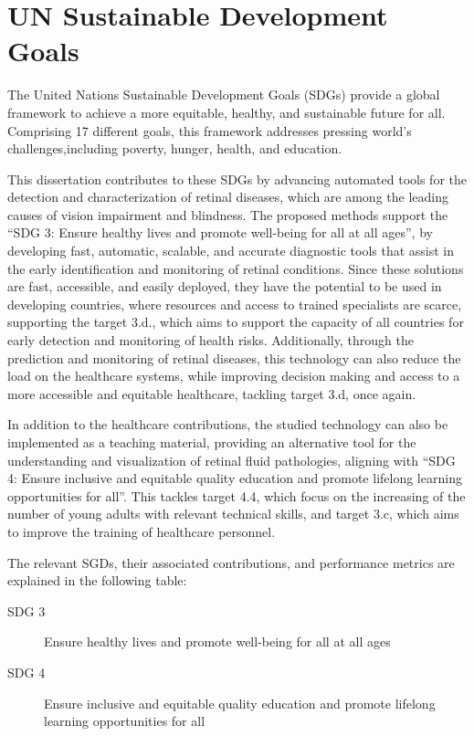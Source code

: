\chapter*{UN Sustainable Development Goals} \label{chap:UnitedNations}

The United Nations Sustainable Development Goals (SDGs) provide a global framework to achieve a more equitable, healthy, and sustainable future for all. Comprising 17 different goals, this framework addresses pressing world's challenges,including poverty, hunger, health, and education.
\par
This dissertation contributes to these SDGs by advancing automated tools for the detection and characterization of retinal diseases, which are among the leading causes of vision impairment and blindness. The proposed methods support the ``SDG 3: Ensure healthy lives and promote well-being for all at all ages'', by developing fast, automatic, scalable, and accurate diagnostic tools that assist in the early identification and monitoring of retinal conditions. Since these solutions are fast, accessible, and easily deployed, they have the potential to be used in developing countries, where resources and access to trained specialists are scarce, supporting the target 3.d., which aims to support the capacity of all countries for early detection and monitoring of health risks. Additionally, through the prediction and monitoring of retinal diseases, this technology can also reduce the load on the healthcare systems, while improving decision making and access to a more accessible and equitable healthcare, tackling target 3.d, once again.
\par
In addition to the healthcare contributions, the studied technology can also be implemented as a teaching material, providing an alternative tool for the understanding and visualization of retinal fluid pathologies, aligning with ``SDG 4: Ensure inclusive and equitable quality education and promote lifelong learning opportunities for all''. This tackles target 4.4, which focus on the increasing of the number of young adults with relevant technical skills, and target 3.c, which aims to improve the training of healthcare personnel.
\par
The relevant SGDs, their associated contributions, and performance metrics are explained in the following table:

\begin{description}
\item [SDG 3]
Ensure healthy lives and promote well-being for all at all ages
\item [SDG 4]
Ensure inclusive and equitable quality education and promote lifelong learning opportunities for all
\end{description}

